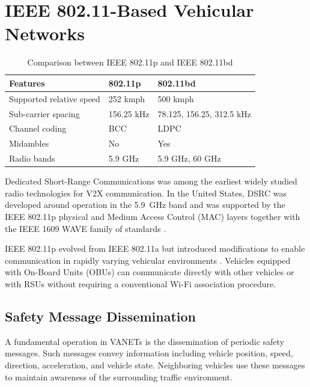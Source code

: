 \section{IEEE 802.11-Based Vehicular Networks}
\label{sec:80211_vanet}
\begin{table}[!ht]
\centering
\caption{Comparison between IEEE 802.11p and IEEE 802.11bd}
\label{tab:80211p_80211bd_comparison}
\renewcommand{\arraystretch}{1.15}
\begin{tabular}{p{} p{} p{}}
\hline\hline
\textbf{Features} & \textbf{802.11p} & \textbf{802.11bd} \\
\hline
Supported relative speed
& 252 kmph
& 500 kmph \\

Sub-carrier spacing
& 156.25 kHz
& 78.125, 156.25, 312.5 kHz \\

Channel coding
& BCC
& LDPC \\

Midambles
& No
& Yes \\

Radio bands
& 5.9 GHz
& 5.9 GHz, 60 GHz \\
\hline\hline
\end{tabular}
\end{table}
Dedicated Short-Range Communications was among the earliest widely studied
radio technologies for V2X communication. In the United States, DSRC was
developed around operation in the 5.9~GHz band and was supported by the
IEEE 802.11p physical and Medium Access Control (MAC) layers together with
the IEEE 1609 WAVE family of standards
\cite{kenney2011dsrc,morgan2010dsrc}.

IEEE 802.11p evolved from IEEE 802.11a but introduced modifications to enable
communication in rapidly varying vehicular environments
\cite{jiang2008ieee}. Vehicles equipped with On-Board Units (OBUs) can
communicate directly with other vehicles or with RSUs without requiring a
conventional Wi-Fi association procedure.

\subsection{Safety Message Dissemination}

A fundamental operation in VANETs is the dissemination of periodic safety
messages. Such messages convey information including vehicle position,
speed, direction, acceleration, and vehicle state. Neighboring vehicles use
these messages to maintain awareness of the surrounding traffic environment.

